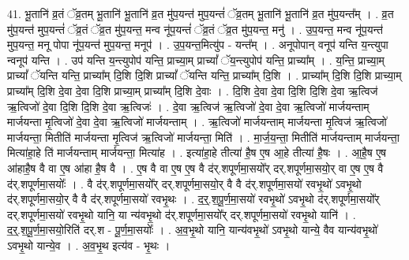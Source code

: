\documentclass[17pt]{extarticle}
\begin{document}
41. भू॒तानि॑ व्र॒तं ॅव्र॒तम् भू॒तानि॑ भू॒तानि॑ व्र॒त मु॑प॒यन्त॑ मुप॒यन्तं॑ ॅव्र॒तम् भू॒तानि॑ भू॒तानि॑ व्र॒त मु॑प॒यन्त᳚म् । . व्र॒त मु॑प॒यन्त॑ मुप॒यन्तं॑ ॅव्र॒तं ॅव्र॒त मु॑प॒यन्त॒ मन्व नू॑प॒यन्तं॑ ॅव्र॒तं ॅव्र॒त मु॑प॒यन्त॒ मनु॑ । . उ॒प॒यन्त॒ मन्व नू॑प॒यन्त॑ मुप॒यन्त॒ मनू पोपा नू॑प॒यन्त॑ मुप॒यन्त॒ मनूप॑ । . उ॒प॒यन्त॒मित्यु॑प - यन्त᳚म् । . अनूपोपान् वनूप॑ यन्ति य॒न्त्युपा न्वनूप॑ यन्ति । . उप॑ यन्ति य॒न्त्युपोप॑ यन्ति॒ प्राच्या॒म् प्राच्यां᳚ ॅय॒न्त्युपोप॑ यन्ति॒ प्राच्या᳚म् । . य॒न्ति॒ प्राच्या॒म् प्राच्यां᳚ ॅयन्ति यन्ति॒ प्राच्या᳚म् दि॒शि दि॒शि प्राच्यां᳚ ॅयन्ति यन्ति॒ प्राच्या᳚म् दि॒शि । . प्राच्या᳚म् दि॒शि दि॒शि प्राच्या॒म् प्राच्या᳚म् दि॒शि दे॒वा दे॒वा दि॒शि प्राच्या॒म् प्राच्या᳚म् दि॒शि दे॒वाः । . दि॒शि दे॒वा दे॒वा दि॒शि दि॒शि दे॒वा ऋ॒त्विज॑ ऋ॒त्विजो॑ दे॒वा दि॒शि दि॒शि दे॒वा ऋ॒त्विजः॑ । . दे॒वा ऋ॒त्विज॑ ऋ॒त्विजो॑ दे॒वा दे॒वा ऋ॒त्विजो॑ मार्जयन्ताम् मार्जयन्ता मृ॒त्विजो॑ दे॒वा दे॒वा ऋ॒त्विजो॑ मार्जयन्ताम् । . ऋ॒त्विजो॑ मार्जयन्ताम् मार्जयन्ता मृ॒त्विज॑ ऋ॒त्विजो॑ मार्जयन्ता॒ मितीति॑ मार्जयन्ता मृ॒त्विज॑ ऋ॒त्विजो॑ मार्जयन्ता॒ मिति॑ । . मा॒र्ज॒य॒न्ता॒ मितीति॑ मार्जयन्ताम् मार्जयन्ता॒ मित्या॑हा॒हे ति॑ मार्जयन्ताम् मार्जयन्ता॒ मित्या॑ह । . इत्या॑हा॒हे तीत्या॑ है॒ष ए॒ष आ॒हे तीत्या॑ है॒षः । . आ॒है॒ष ए॒ष आ॑हाहै॒ष वै वा ए॒ष आ॑हा है॒ष वै । . ए॒ष वै वा ए॒ष ए॒ष वै द॑र्.शपूर्णमा॒सयो᳚र् दर्.शपूर्णमा॒सयो॒र् वा ए॒ष ए॒ष वै द॑र्.शपूर्णमा॒सयोः᳚ । . वै द॑र्.शपूर्णमा॒सयो᳚र् दर्.शपूर्णमा॒सयो॒र् वै वै द॑र्.शपूर्णमा॒सयो॑ रवभृ॒थो॑ ऽवभृ॒थो द॑र्.शपूर्णमा॒सयो॒र् वै वै द॑र्.शपूर्णमा॒सयो॑ रवभृ॒थः । . द॒र्॒.श॒पू॒र्ण॒मा॒सयो॑ रवभृ॒थो॑ ऽवभृ॒थो द॑र्.शपूर्णमा॒सयो᳚र् दर्.शपूर्णमा॒सयो॑ रवभृ॒थो यानि॒ या न्य॑वभृ॒थो द॑र्.शपूर्णमा॒सयो᳚र् दर्.शपूर्णमा॒सयो॑ रवभृ॒थो यानि॑ । . द॒र्॒.श॒पू॒र्ण॒मा॒सयो॒रिति॑ दर्.श - पू॒र्ण॒मा॒सयोः᳚ । . अ॒व॒भृ॒थो यानि॒ यान्य॑वभृ॒थो॑ ऽवभृ॒थो यान्ये॒ वैव यान्य॑वभृ॒थो॑ ऽवभृ॒थो यान्ये॒व । . अ॒व॒भृ॒थ इत्य॑व - भृ॒थः । \newline
\pagebreak
{}
\end{document}
